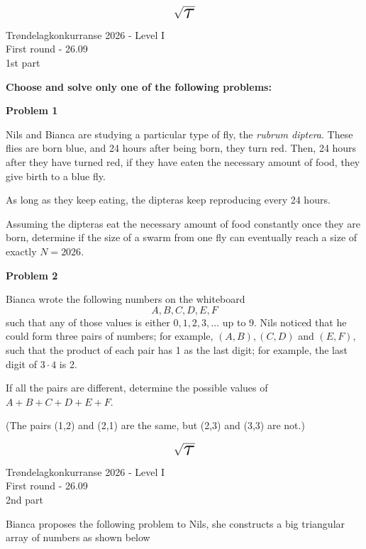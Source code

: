 \documentclass[a4paper,12pt]{article}
\begin{document}
\begingroup
\setlength{\parindent}{0pt}

\begin{center}
	\huge $$\sqrt{\scalebox{2.1}{$\tau$}}$$
	\Large Trøndelagkonkurranse 2026 - Level I\\[2pt] First round - 26.09\\
	1st part
\end{center}
\vspace{1cm}

{\bf Choose and solve only one of the following problems:}

\vspace{.7cm}
{\bf Problem 1}

Nils and Bianca are studying a particular type of fly, the {\it rubrum diptera}. These flies are born blue, and 24 hours after being born, they turn red. Then, 24 hours after they have turned red, if they have eaten the necessary amount of food, they give birth to a blue fly.

As long as they keep eating, the dipteras keep reproducing every 24 hours.

Assuming the dipteras eat the necessary amount of food constantly once they are born, determine if the size of a swarm from one fly can eventually reach a size of exactly $N=2026$. 

\vspace{.7cm}
{\bf Problem 2}

Bianca wrote the following numbers on the whiteboard
$$A,B,C,D,E,F$$
such that any of those values is either $0,1,2,3,\ldots$ up to 9. Nils noticed that he could form three pairs of numbers; for example, $(A,B),(C,D)$ and $(E,F)$, such that the product of each pair has 1 as the last digit; for example, the last digit of $3\cdot4$ is 2.

If all the pairs are different, determine the possible values of $A+B+C+D+E+F$.

(The pairs (1,2) and (2,1) are the same, but (2,3) and (3,3) are not.)


\newpage %


\begin{center}
	\huge $$\sqrt{\scalebox{2.1}{$\tau$}}$$
	\Large Trøndelagkonkurranse 2026 - Level I\\[2pt] First round - 26.09\\
	2nd part
\end{center}
\vspace{1cm}

Bianca proposes the following problem to Nils, she constructs a big triangular array of numbers as shown below 
\end{document}
